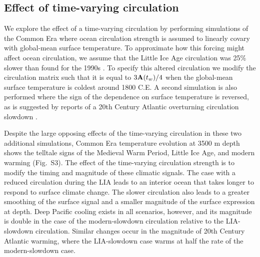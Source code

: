 \documentclass[12pt]{article}
\begin{document}

\subsection{Effect of time-varying circulation}

We explore the effect of a time-varying circulation by performing
simulations of the Common Era where ocean circulation
strength is assumed to linearly covary with global-mean surface
temperature. To approximate how this forcing might affect ocean
circulation, we assume that the Little Ice Age circulation was 25\%
slower than found for the 1990s \cite{Lund-Lynch-Stiegl-2006:Gulf}.
To specify this altered circulation we modify the circulation matrix
such that it is equal to $3{\bf A}(t_w)/4$ when the global-mean
surface temperature is coldest around 1800 C.E. A second simulation is
also performed where the sign of the dependence on surface temperature
is reversed, as is suggested by reports of a 20th Century Atlantic
overturning circulation slowdown
\cite{Rahmstorf-Box-2015:Exceptional}.

Despite the large opposing effects of the time-varying circulation in
these two additional simulations, Common Era temperature evolution at
3500 m depth shows the telltale signs of the Medieval Warm Period,
Little Ice Age, and modern warming (Fig.~S3). The effect of the
time-varying circulation strength is to modify the timing and
magnitude of these climatic signals. The case with a reduced
circulation during the LIA leads to an interior ocean that takes
longer to respond to surface climate change. The slower circulation
also leads to a greater smoothing of the surface signal and a smaller
magnitude of the surface expression at depth. Deep Pacific cooling
exists in all scenarios, however, and its magnitude is double in the
case of the modern-slowdown circulation relative to the LIA-slowdown
circulation. Similar changes occur in the magnitude of 20th Century
Atlantic warming, where the LIA-slowdown case warms at half the rate
of the modern-slowdown case.
\end{document}
